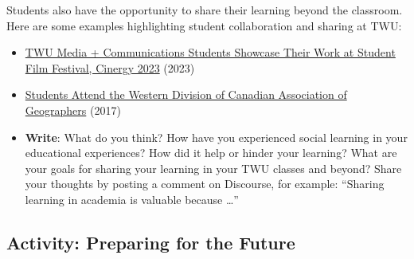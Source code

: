 \documentclass[
  letterpaper,
  DIV=11,
  numbers=noendperiod]{scrreprt}
\begin{document}
\begin{tcolorbox}
Students also have the opportunity to share their learning beyond the
classroom. Here are some examples highlighting student collaboration and
sharing at TWU:

\begin{itemize}
\item
  \href{https://www.twu.ca/news-events/news/twu-media-communications-students-showcase-their-work-student-film-festival}{TWU
  Media + Communications Students Showcase Their Work at Student Film
  Festival, Cinergy 2023} (2023)
\item
  \href{https://www.twu.ca/research/student-research/news}{Students
  Attend the Western Division of Canadian Association of Geographers}
  (2017)
\item
  \textbf{Write}: What do you think? How have you experienced social
  learning in your educational experiences? How did it help or hinder
  your learning? What are your goals for sharing your learning in your
  TWU classes and beyond? Share your thoughts by posting a comment on
  Discourse, for example: ``Sharing learning in academia is valuable
  because \ldots{}''
\end{itemize}

\end{tcolorbox}

\subsection{Activity: Preparing for the
Future}\label{activity-preparing-for-the-future}
\end{document}
